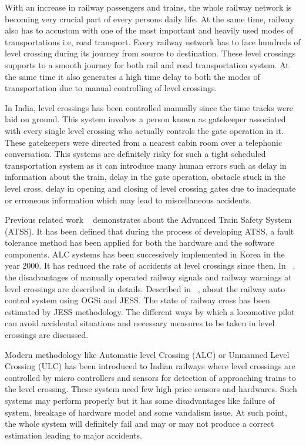\documentclass{llncs}
\begin{document}
With an increase in railway passengers and trains, the whole railway network is becoming very crucial part of every persons daily life. At the same time, railway also has to accustom with one of the most important and heavily used modes of transportations i.e, road transport. Every railway network has to face hundreds of level crossing during its journey from source to destination. These level crossings supports to a smooth journey for both rail and road transportation system. At the same time it also generates a high time delay to both the modes of transportation due to manual controlling of level crossings.

In India, level crossings has been controlled manually since the time tracks were laid on ground. This system involves a person known as gatekeeper associated with every single level crossing who actually controls the gate operation in it. These gatekeepers were directed from a nearest cabin room over a telephonic conversation. This systems are definitely risky for such a tight scheduled transportation system as it can introduce many human errors such as delay in information about the train, delay in the gate operation, obstacle stuck in the level cross, delay in opening and closing of level crossing gates due to inadequate or erroneous information which may lead to miscellaneous accidents. 

Previous related work ~\cite{b3,b4,b5,b6} demonstrates about the Advanced Train Safety System (ATSS). It has been defined that during the process of developing ATSS, a fault tolerance method has been applied for both the hardware and the software components. ALC systems has been successively implemented in Korea in the year 2000. It has reduced the rate of accidents at level crossings since then. 	In ~\cite{b6}, the disadvantages of manually operated railway signals and railway warnings at level crossings are described in details. Described in ~\cite{b5}, about the railway auto control system using OGSi and JESS. The state of railway cross has been estimated by JESS methodology. The different ways by which a locomotive pilot can avoid accidental situations and necessary measures to be taken in level crossings are discussed.

Modern methodology like Automatic level Crossing (ALC) or Unmanned Level Crossing (ULC) has been introduced to Indian railways where level crossings are controlled by micro controllers and sensors for detection of approaching trains to the level crossing. These system need few high price sensors and hardwares. Such systems may perform properly but it has some disadvantages like failure of system, breakage of hardware model and some vandalism issue. At such point, the whole system will definitely fail and may or may not produce a correct estimation  leading to major accidents.   
\end{document}
